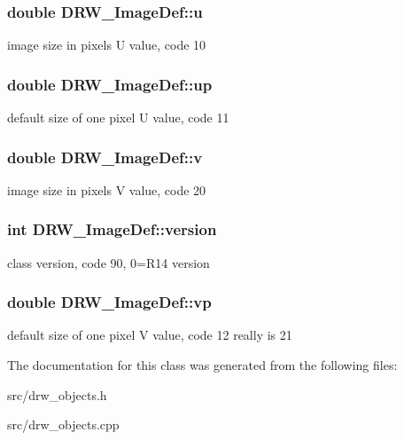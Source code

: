 \subsubsection[{u}]{\setlength{\rightskip}{0pt plus 5cm}double D\+R\+W\+\_\+\+Image\+Def\+::u}\label{class_d_r_w___image_def_afe11ccfebf55c9ec07a92cda8f09d98c}
image size in pixels U value, code 10 \hypertarget{class_d_r_w___image_def_ad33a25f477e0448bae9a74fc902efafc}{}
\subsubsection[{up}]{\setlength{\rightskip}{0pt plus 5cm}double D\+R\+W\+\_\+\+Image\+Def\+::up}\label{class_d_r_w___image_def_ad33a25f477e0448bae9a74fc902efafc}
default size of one pixel U value, code 11 \hypertarget{class_d_r_w___image_def_a25c16e07b7d0887cf71f4d276b58217c}{}
\subsubsection[{v}]{\setlength{\rightskip}{0pt plus 5cm}double D\+R\+W\+\_\+\+Image\+Def\+::v}\label{class_d_r_w___image_def_a25c16e07b7d0887cf71f4d276b58217c}
image size in pixels V value, code 20 \hypertarget{class_d_r_w___image_def_a2f47b0e3ad2e33f750bbe97d3e30ceaf}{}
\subsubsection[{version}]{\setlength{\rightskip}{0pt plus 5cm}int D\+R\+W\+\_\+\+Image\+Def\+::version}\label{class_d_r_w___image_def_a2f47b0e3ad2e33f750bbe97d3e30ceaf}
class version, code 90, 0=R14 version \hypertarget{class_d_r_w___image_def_a95e92947b72818845b6cd9fe0c9add8a}{}
\subsubsection[{vp}]{\setlength{\rightskip}{0pt plus 5cm}double D\+R\+W\+\_\+\+Image\+Def\+::vp}\label{class_d_r_w___image_def_a95e92947b72818845b6cd9fe0c9add8a}
default size of one pixel V value, code 12 really is 21 

The documentation for this class was generated from the following files\+:\begin{DoxyCompactItemize}
\item 
src/drw\+\_\+objects.\+h\item 
src/drw\+\_\+objects.\+cpp\end{DoxyCompactItemize}
